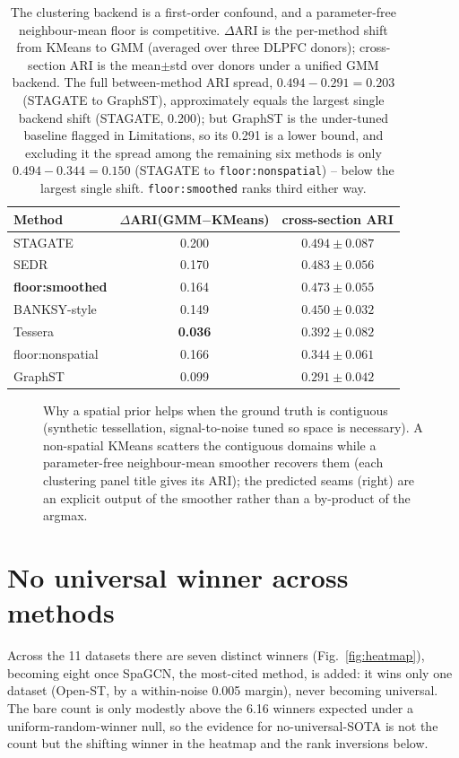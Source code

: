 \documentclass[journal]{IEEEtran}
\begin{document}
\begin{table}[htbp]\centering\small
\caption{The clustering backend is a first-order confound, and a parameter-free neighbour-mean floor is
competitive. $\Delta$ARI is the per-method shift from KMeans to GMM (averaged over three DLPFC donors);
cross-section ARI is the mean$\pm$std over donors under a unified GMM backend. The full between-method ARI
spread, $0.494-0.291=0.203$ (STAGATE to GraphST), approximately equals the largest single backend shift
(STAGATE, 0.200); but GraphST is the under-tuned baseline flagged in Limitations, so its 0.291 is a lower
bound, and excluding it the spread among the remaining six methods is only $0.494-0.344=0.150$
(STAGATE to \texttt{floor:nonspatial}) -- below the largest single shift. \texttt{floor:smoothed} ranks
third either way.}
\label{tab:backend}
\begin{tabular}{lcc}
\toprule
Method & $\Delta$ARI(GMM$-$KMeans) & cross-section ARI\\
\midrule
STAGATE          & 0.200 & $0.494\pm0.087$\\
SEDR             & 0.170 & $0.483\pm0.056$\\
\textbf{floor:smoothed} & 0.164 & $\mathbf{0.473\pm0.055}$\\
BANKSY-style     & 0.149 & $0.450\pm0.032$\\
Tessera          & \textbf{0.036} & $0.392\pm0.082$\\
floor:nonspatial & 0.166 & $0.344\pm0.061$\\
GraphST          & 0.099 & $0.291\pm0.042$\\
\bottomrule
\end{tabular}
\end{table}

\begin{figure}[!t]\centering
\resizebox{\linewidth}{!}{}
\caption{Why a spatial prior helps when the ground truth is contiguous (synthetic tessellation,
signal-to-noise tuned so space is necessary). A non-spatial KMeans scatters the contiguous domains while a
parameter-free neighbour-mean smoother recovers them (each clustering panel title gives its ARI); the predicted seams
(right) are an explicit output of the smoother rather than a by-product of the argmax.}
\end{figure}

\section{No universal winner across methods}\label{sec:nosota}
Across the 11 datasets there are seven distinct winners (Fig.~\ref{fig:heatmap}), becoming eight once
SpaGCN, the most-cited method, is added: it wins only one dataset (Open-ST, by a within-noise 0.005
margin), never becoming universal. The bare count is only modestly above the 6.16 winners expected under a uniform-random-winner null, so the evidence for no-universal-SOTA is not the count but the
shifting winner in the heatmap and the rank inversions below.
\end{document}
